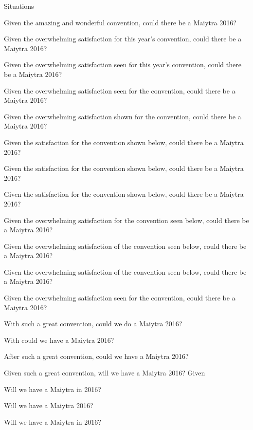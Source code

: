 \documentclass[serif, mathserif, final]{beamer}
\begin{document}
\begin{frame}{}
\begin{columns}
\begin{column}{0.20\linewidth}
\begin{block}{Situations}
\begin{itemize}
{         Given the amazing and wonderful convention, could there be a
         Maiytra 2016?


         Given the overwhelming satisfaction for this year's
         convention, could there be a Maiytra 2016?

         Given the overwhelming satisfaction seen for this year's
         convention, could there be a Maiytra 2016?

         Given the overwhelming satisfaction seen for the convention,
         could there be a Maiytra 2016?

         Given the overwhelming satisfaction shown for the convention,
         could there be a Maiytra 2016?  

         Given the satisfaction for the convention shown below,
         could there be a Maiytra 2016?  

         Given the satisfaction for the convention shown below,
         could there be a Maiytra 2016?  

         Given the satisfaction for the convention shown below,
         could there be a Maiytra 2016?  


         Given the overwhelming satisfaction for the convention seen below,
         could there be a Maiytra 2016?  

         Given the overwhelming satisfaction of the convention seen below,
         could there be a Maiytra 2016?  

         Given the overwhelming satisfaction of the convention seen below,
         could there be a Maiytra 2016?  


         Given the overwhelming satisfaction seen for the convention,
         could there be a Maiytra 2016?  



         With such a great convention, could we do a Maiytra 2016? 

         With could we have a Maiytra 2016? 




         After such a great convention, could we have a Maiytra 2016? 

         Given such a great convention, will we have a Maiytra 2016? 
         Given 


         Will we have a Maiytra in 2016?  


         Will we have a Maiytra 2016?  

         Will we have a Maiytra in 2016? 
         }


\end{itemize}
\end{block}
\end{column}
\end{columns}
\end{frame}
\end{document}
